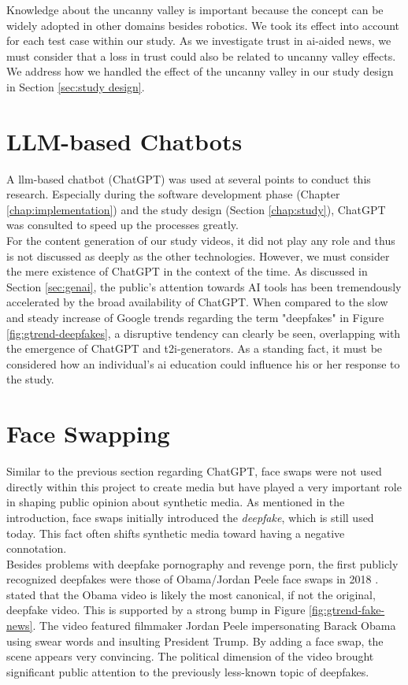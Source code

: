\documentclass[
  a4paper,  %
  twoside,  %
  bibliography=totoc,
  headsepline,
  cleardoublepage=empty,
  parskip=half,
  draft=false
]{scrbook}
\begin{document}
Knowledge about the uncanny valley is important because the concept can be widely adopted in other domains besides robotics. We took its effect into account for each test case within our study. As we investigate trust in \gls{ai}-aided news, we must consider that a loss in trust could also be related to uncanny valley effects. \\
We address how we handled the effect of the uncanny valley in our study design in Section \ref{sec:study design}.

\section{LLM-based Chatbots}
A \gls{llm}-based chatbot (ChatGPT) was used at several points to conduct this research. Especially during the software development phase (Chapter \ref{chap:implementation}) and the study design (Section \ref{chap:study}), ChatGPT was consulted to speed up the processes greatly. \\ 
For the content generation of our study videos, it did not play any role and thus is not discussed as deeply as the other technologies. However, we must consider the mere existence of ChatGPT in the context of the time. As discussed in Section \ref{sec:genai}, the public's attention towards AI tools has been tremendously accelerated by the broad availability of ChatGPT. When compared to the slow and steady increase of Google trends regarding the term "deepfakes" in Figure \ref{fig:gtrend-deepfakes}, a disruptive tendency can clearly be seen, overlapping with the emergence of ChatGPT and \gls{t2i}-generators. As a standing fact, it must be considered how an individual's \gls{ai} education could influence his or her response to the study.

\section{Face Swapping}
\label{sec:face-swapping}
Similar to the previous section regarding ChatGPT, face swaps were not used directly within this project to create media but have played a very important role in shaping public opinion about synthetic media. As mentioned in the introduction, face swaps initially introduced the \textit{deepfake}, which is still used today. This fact often shifts synthetic media toward having a negative connotation. \\
Besides problems with deepfake pornography and revenge porn, the first publicly recognized deepfakes were those of Obama/Jordan Peele face swaps in 2018 \cite{vincentWatchJordanPeele2018}. \citet{hancockSocialImpactDeepfakes2021} stated that the Obama video is likely the most canonical, if not the original, deepfake video. This is supported by a strong bump in Figure \ref{fig:gtrend-fake-news}. The video featured filmmaker Jordan Peele impersonating Barack Obama using swear words and insulting President Trump. By adding a face swap, the scene appears very convincing. The political dimension of the video brought significant public attention to the previously less-known topic of deepfakes.
\end{document}
